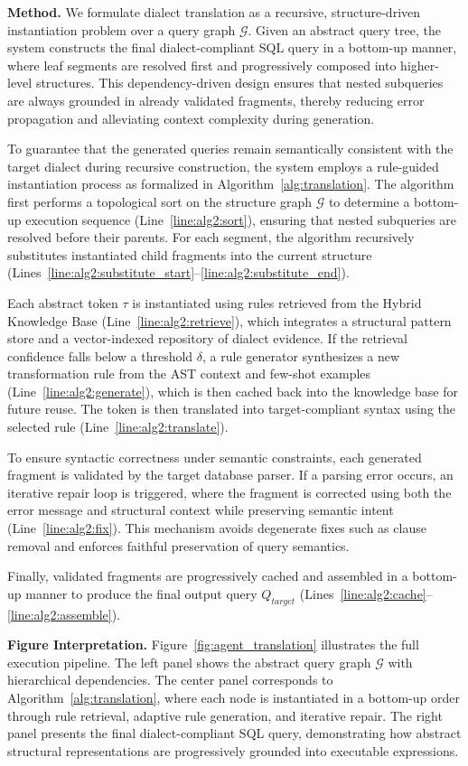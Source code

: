\textbf{Method.}
We formulate dialect translation as a recursive, structure-driven instantiation problem over a query graph $\mathcal{G}$. Given an abstract query tree, the system constructs the final dialect-compliant SQL query in a bottom-up manner, where leaf segments are resolved first and progressively composed into higher-level structures. This dependency-driven design ensures that nested subqueries are always grounded in already validated fragments, thereby reducing error propagation and alleviating context complexity during generation.

To guarantee that the generated queries remain semantically consistent with the target dialect during recursive construction, the system employs a rule-guided instantiation process as formalized in Algorithm~\ref{alg:translation}. The algorithm first performs a topological sort on the structure graph $\mathcal{G}$ to determine a bottom-up execution sequence (Line~\ref{line:alg2:sort}), ensuring that nested subqueries are resolved before their parents. For each segment, the algorithm recursively substitutes instantiated child fragments into the current structure (Lines~\ref{line:alg2:substitute_start}--\ref{line:alg2:substitute_end}).

Each abstract token $\tau$ is instantiated using rules retrieved from the Hybrid Knowledge Base (Line~\ref{line:alg2:retrieve}), which integrates a structural pattern store and a vector-indexed repository of dialect evidence. If the retrieval confidence falls below a threshold $\delta$, a rule generator synthesizes a new transformation rule from the AST context and few-shot examples (Line~\ref{line:alg2:generate}), which is then cached back into the knowledge base for future reuse. The token is then translated into target-compliant syntax using the selected rule (Line~\ref{line:alg2:translate}).

To ensure syntactic correctness under semantic constraints, each generated fragment is validated by the target database parser. If a parsing error occurs, an iterative repair loop is triggered, where the fragment is corrected using both the error message and structural context while preserving semantic intent (Line~\ref{line:alg2:fix}). This mechanism avoids degenerate fixes such as clause removal and enforces faithful preservation of query semantics.

Finally, validated fragments are progressively cached and assembled in a bottom-up manner to produce the final output query $Q_{target}$ (Lines~\ref{line:alg2:cache}--\ref{line:alg2:assemble}).

\textbf{Figure Interpretation.}
Figure~\ref{fig:agent_translation} illustrates the full execution pipeline. The left panel shows the abstract query graph $\mathcal{G}$ with hierarchical dependencies. The center panel corresponds to Algorithm~\ref{alg:translation}, where each node is instantiated in a bottom-up order through rule retrieval, adaptive rule generation, and iterative repair. The right panel presents the final dialect-compliant SQL query, demonstrating how abstract structural representations are progressively grounded into executable expressions.